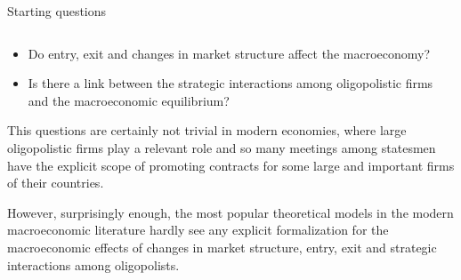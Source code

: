 \documentclass[9pt]{beamer}
\begin{document}
\begin{frame}{Starting questions}


\begin{columns}[T]
\begin{column}{.6\textwidth}
\begin{block}{}

\begin{itemize}

\item
Do entry, exit and changes in market structure affect the macroeconomy?

\item Is there a link between the strategic interactions among oligopolistic firms and the macroeconomic equilibrium?

\end{itemize}

\smallskip
\small
This questions are certainly not trivial in modern economies, where large oligopolistic firms play a relevant role and so many meetings among statesmen have the explicit scope of promoting contracts for some large and important firms of their countries. 

However, surprisingly enough, the most popular theoretical models in the modern macroeconomic literature hardly see any explicit formalization for the macroeconomic effects of changes in market structure, entry, exit and strategic interactions among oligopolists.
     
\end{block}
\end{column}


\end{columns}
\end{frame}
\end{document}

